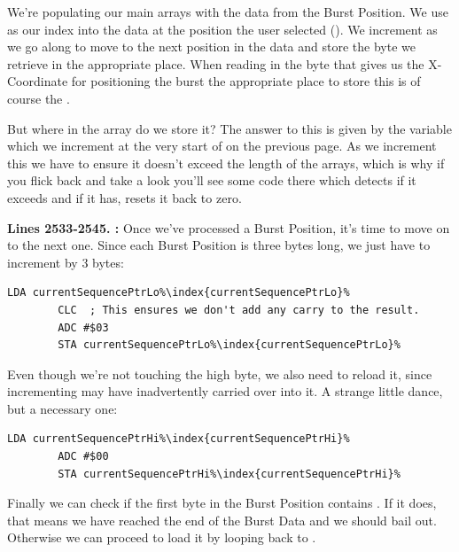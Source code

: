 We're populating our main arrays with the data from the Burst Position. We use  as our index into the data at the position the user selected ().
We increment  as we go along to move to the next position in the data and store the byte we retrieve in the appropriate place. When reading in the byte
that gives us the X-Coordinate for positioning the burst the appropriate place to store this is of course the .

 But where in the array 
do we store it? The answer to this is given by the variable  which we increment at the very start of  on the 
previous page. As we increment this we have to ensure it doesn't exceed the length of the arrays, which is why if you flick back and take a look you'll see some
code there which detects if it exceeds  and if it has, resets it back to zero.

\textbf{Lines 2533-2545. :} Once we've processed a Burst Position, it's time to move on to the next one. Since each Burst Position
is three bytes long, we just have to increment  by 3 bytes:
\begin{lstlisting}[escapechar=\%]
        LDA currentSequencePtrLo%\index{currentSequencePtrLo}%
        CLC  ; This ensures we don't add any carry to the result.
        ADC #$03
        STA currentSequencePtrLo%\index{currentSequencePtrLo}%
\end{lstlisting}

Even though we're not touching the high byte, we also need to reload it, since incrementing  may have inadvertently carried over into it.
A strange little dance, but a necessary one:
\begin{lstlisting}[escapechar=\%]
        LDA currentSequencePtrHi%\index{currentSequencePtrHi}%
        ADC #$00
        STA currentSequencePtrHi%\index{currentSequencePtrHi}%
\end{lstlisting}

Finally we can check if the first byte in the Burst Position contains . If it does, that means we have reached the end of the Burst Data and we should bail out.
Otherwise we can proceed to load it by looping back to .


